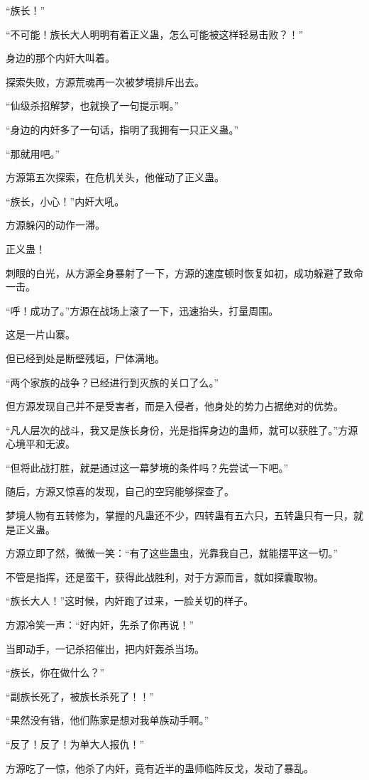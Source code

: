 \begin{this_body}
“族长！”

“不可能！族长大人明明有着正义蛊，怎么可能被这样轻易击败？！”

身边的那个内奸大叫着。

探索失败，方源荒魂再一次被梦境排斥出去。

“仙级杀招解梦，也就换了一句提示啊。”

“身边的内奸多了一句话，指明了我拥有一只正义蛊。”

“那就用吧。”

方源第五次探索，在危机关头，他催动了正义蛊。

“族长，小心！”内奸大吼。

方源躲闪的动作一滞。

正义蛊！

刺眼的白光，从方源全身暴射了一下，方源的速度顿时恢复如初，成功躲避了致命一击。

“呼！成功了。”方源在战场上滚了一下，迅速抬头，打量周围。

这是一片山寨。

但已经到处是断壁残垣，尸体满地。

“两个家族的战争？已经进行到灭族的关口了么。”

但方源发现自己并不是受害者，而是入侵者，他身处的势力占据绝对的优势。

“凡人层次的战斗，我又是族长身份，光是指挥身边的蛊师，就可以获胜了。”方源心境平和无波。

“但将此战打胜，就是通过这一幕梦境的条件吗？先尝试一下吧。”

随后，方源又惊喜的发现，自己的空窍能够探查了。

梦境人物有五转修为，掌握的凡蛊还不少，四转蛊有五六只，五转蛊只有一只，就是正义蛊。

方源立即了然，微微一笑：“有了这些蛊虫，光靠我自己，就能摆平这一切。”

不管是指挥，还是蛮干，获得此战胜利，对于方源而言，就如探囊取物。

“族长大人！”这时候，内奸跑了过来，一脸关切的样子。

方源冷笑一声：“好内奸，先杀了你再说！”

当即动手，一记杀招催出，把内奸轰杀当场。

“族长，你在做什么？”

“副族长死了，被族长杀死了！！”

“果然没有错，他们陈家是想对我单族动手啊。”

“反了！反了！为单大人报仇！”

方源吃了一惊，他杀了内奸，竟有近半的蛊师临阵反戈，发动了暴乱。


\end{this_body}
